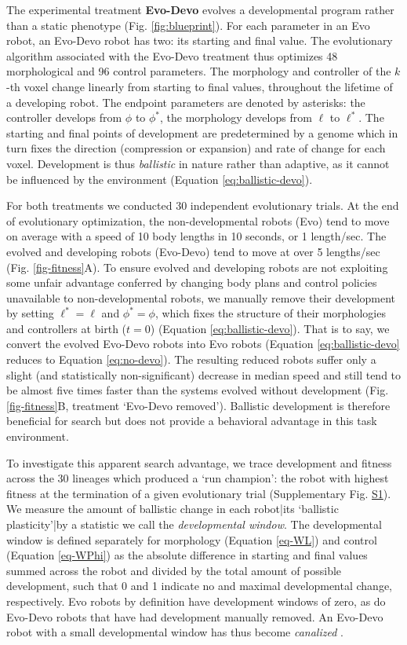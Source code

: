 The experimental treatment \textbf{Evo-Devo} evolves a developmental program rather than a static phenotype (Fig. \ref{fig:blueprint}). 
For each parameter in an Evo robot, an Evo-Devo robot has two: its starting and final value.
The evolutionary algorithm associated with the Evo-Devo treatment thus optimizes 48 morphological and 96 control parameters.
The morphology and controller of the $k$-th voxel change linearly from starting to final values, throughout the lifetime of a developing robot.
The endpoint parameters are denoted by asterisks: the controller develops from $\phi$ to $\phi^*$, the morphology develops from $\ell$ to $\ell^*$.
The starting and final points of development are predetermined by a genome which in turn fixes the direction (compression or expansion) and rate of change for each voxel.
Development is thus \textit{ballistic} in nature rather than adaptive, as it cannot be influenced by the environment (Equation \ref{eq:ballistic-devo}). 


For both treatments we conducted 30 independent evolutionary trials.
At the end of evolutionary optimization, the non-developmental robots (Evo) tend to move on average with a speed of 10 body lengths in 10 seconds, or 1 length/sec. The evolved and developing robots (Evo-Devo) tend to move at over 5 lengths/sec (Fig. \ref{fig-fitness}A).
To ensure evolved and developing robots are not exploiting some unfair advantage conferred by changing body plans and control policies unavailable to non-developmental robots, we manually remove their development by setting $\ell^*=\ell$ and $\phi^*=\phi$, which fixes the structure of their morphologies and controllers at birth ($t=0$) (Equation \ref{eq:ballistic-devo}). 
That is to say, we convert the evolved Evo-Devo robots into Evo robots (Equation \ref{eq:ballistic-devo} reduces to Equation \ref{eq:no-devo}).
The resulting reduced robots suffer only a slight (and statistically non-significant) decrease in median speed and still tend to be almost five times faster than the systems evolved without development (Fig. \ref{fig-fitness}B, treatment `Evo-Devo removed').
Ballistic development is therefore beneficial for search but does not provide a behavioral advantage in this task environment.


To investigate this apparent search advantage, we trace development and fitness across the 30 lineages which produced a `run champion': the robot with highest fitness at the termination of a given evolutionary trial (Supplementary Fig. \hyperref[fig:S1]{S1}). 
We measure the amount of ballistic change in each robot|its `ballistic plasticity'|by a statistic we call the \textit{developmental window}.
The developmental window is defined separately for morphology (Equation \ref{eq-WL}) and control (Equation \ref{eq-WPhi}) as the absolute difference in starting and final values summed across the robot and divided by the total amount of possible development, such that 0 and 1 indicate no and maximal developmental change, respectively.
Evo robots by definition have development windows of zero, as do Evo-Devo robots that have had development manually removed.
An Evo-Devo robot with a small developmental window has thus become \textit{canalized} \cite{waddington1942canalization}.


